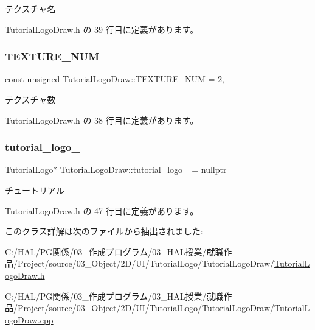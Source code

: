 テクスチャ名 



 Tutorial\+Logo\+Draw.\+h の 39 行目に定義があります。

\mbox{\label{class_tutorial_logo_draw_aff3396323c386d499aa23e5605085ab1}} 
\subsubsection{\texorpdfstring{T\+E\+X\+T\+U\+R\+E\+\_\+\+N\+UM}{TEXTURE\_NUM}}
{\footnotesize\ttfamily const unsigned Tutorial\+Logo\+Draw\+::\+T\+E\+X\+T\+U\+R\+E\+\_\+\+N\+UM = 2\hspace{0.3cm}{\ttfamily [static]}, {\ttfamily [private]}}



テクスチャ数 



 Tutorial\+Logo\+Draw.\+h の 38 行目に定義があります。

\mbox{\label{class_tutorial_logo_draw_ab357c25048d3582466a24234896adf3f}} 
\subsubsection{\texorpdfstring{tutorial\+\_\+logo\+\_\+}{tutorial\_logo\_}}
{\footnotesize\ttfamily \mbox{\hyperlink{class_tutorial_logo}{Tutorial\+Logo}}$\ast$ Tutorial\+Logo\+Draw\+::tutorial\+\_\+logo\+\_\+ = nullptr\hspace{0.3cm}{\ttfamily [private]}}



チュートリアル 



 Tutorial\+Logo\+Draw.\+h の 47 行目に定義があります。



このクラス詳解は次のファイルから抽出されました\+:\begin{DoxyCompactItemize}
\item 
C\+:/\+H\+A\+L/\+P\+G関係/03\+\_\+作成プログラム/03\+\_\+\+H\+A\+L授業/就職作品/\+Project/source/03\+\_\+\+Object/2\+D/\+U\+I/\+Tutorial\+Logo/\+Tutorial\+Logo\+Draw/\mbox{\hyperlink{_tutorial_logo_draw_8h}{Tutorial\+Logo\+Draw.\+h}}\item 
C\+:/\+H\+A\+L/\+P\+G関係/03\+\_\+作成プログラム/03\+\_\+\+H\+A\+L授業/就職作品/\+Project/source/03\+\_\+\+Object/2\+D/\+U\+I/\+Tutorial\+Logo/\+Tutorial\+Logo\+Draw/\mbox{\hyperlink{_tutorial_logo_draw_8cpp}{Tutorial\+Logo\+Draw.\+cpp}}\end{DoxyCompactItemize}
